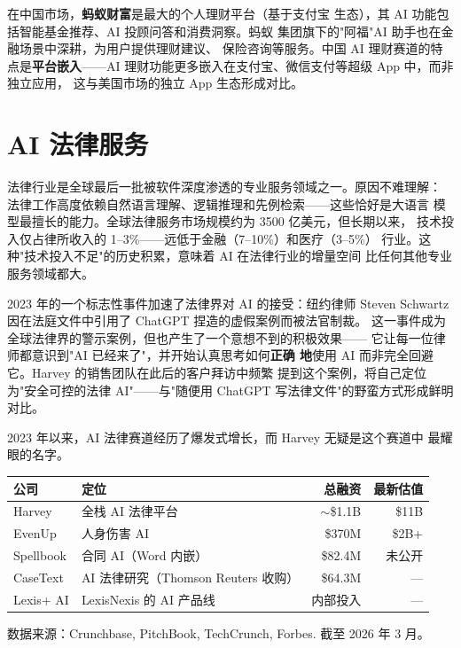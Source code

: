 在中国市场，\textbf{蚂蚁财富}是最大的个人理财平台（基于支付宝
生态），其 AI 功能包括智能基金推荐、AI 投顾问答和消费洞察。蚂蚁
集团旗下的"阿福"AI 助手也在金融场景中深耕，为用户提供理财建议、
保险咨询等服务。中国 AI 理财赛道的特点是\textbf{平台嵌入}——AI
理财功能更多嵌入在支付宝、微信支付等超级 App 中，而非独立应用，
这与美国市场的独立 App 生态形成对比。



\section{AI 法律服务}
\label{sec:life-legal}

法律行业是全球最后一批被软件深度渗透的专业服务领域之一。原因不难理解：
法律工作高度依赖自然语言理解、逻辑推理和先例检索——这些恰好是大语言
模型最擅长的能力。全球法律服务市场规模约为 3500 亿美元，但长期以来，
技术投入仅占律所收入的 1--3\%——远低于金融（7--10\%）和医疗（3--5\%）
行业。这种"技术投入不足"的历史积累，意味着 AI 在法律行业的增量空间
比任何其他专业服务领域都大。

2023 年的一个标志性事件加速了法律界对 AI 的接受：纽约律师 Steven
Schwartz 因在法庭文件中引用了 ChatGPT 捏造的虚假案例而被法官制裁。
这一事件成为全球法律界的警示案例，但也产生了一个意想不到的积极效果——
它让每一位律师都意识到"AI 已经来了"，并开始认真思考如何\textbf{正确
地}使用 AI 而非完全回避它。Harvey 的销售团队在此后的客户拜访中频繁
提到这个案例，将自己定位为"安全可控的法律 AI"——与"随便用 ChatGPT
写法律文件"的野蛮方式形成鲜明对比。

2023 年以来，AI 法律赛道经历了爆发式增长，而 Harvey 无疑是这个赛道中
最耀眼的名字。

\begin{keybox}[AI 法律赛道融资一览]
\small
\begin{tabularx}{\textwidth}{l X r r}
\toprule
\rowcolor{figLightGray}
\textbf{公司} & \textbf{定位} & \textbf{总融资} & \textbf{最新估值} \\
\midrule
Harvey         & 全栈 AI 法律平台          & $\sim$\$1.1B  & \$11B \\
EvenUp         & 人身伤害 AI               & \$370M        & \$2B+ \\
Spellbook      & 合同 AI（Word 内嵌）       & \$82.4M       & 未公开 \\
CaseText       & AI 法律研究（Thomson Reuters 收购）  & \$64.3M  & --- \\
Lexis+ AI      & LexisNexis 的 AI 产品线   & 内部投入       & --- \\
\bottomrule
\end{tabularx}

\medskip
\noindent 数据来源：Crunchbase, PitchBook, TechCrunch, Forbes.
截至 2026 年 3 月。
\end{keybox}


